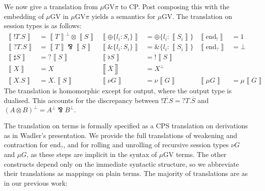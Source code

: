 \documentclass[orivec,envcountsame]{llncs}
\newcommand{\with}{\mathbin\binampersand}
\newcommand{\parr}{\mathbin\bindnasrepma}
\newcommand{\cpdual}[1]{#1^\perp}
\newcommand{\cpbang}[1]{{! #1}}
\newcommand{\cpquery}[1]{{? #1}}
\newcommand{\gvdual}[1]{\overline{#1}}
\newcommand{\gvout}[2]{{!#1.#2}}
\newcommand{\gvin}[2]{{?#1.#2}}
\newcommand{\outterm}{\mathrm{end}_!}
\newcommand{\interm}{\mathrm{end}_?}
\newcommand{\gvserver}[1]{\flat #1}
\newcommand{\gvservice}[1]{\sharp #1}
\newcommand{\tocp}[1]{\left\llbracket #1 \right\rrbracket}
\newcommand{\mugv}{$\mu\mathrm{GV}$\xspace}
\newcommand{\gvpi}{$\mu\mathrm{GV}\pi$\xspace}
\begin{document}
We now give a translation from \gvpi to CP. Post composing this with the embedding of \mugv in
\gvpi yields a semantics for \mugv. The translation on session types is as follows:
\begin{align*}
\tocp{\gvout{T}{S}}        &= \cpdual{\tocp{T}} \otimes \tocp{S} &
\tocp{\oplus \{l_i:S_i \}} &= \oplus \{l_i:\tocp{S_i}\} &
\tocp{\outterm}            &= 1 \\
\tocp{\gvin{T}{S}}         &= \tocp{T} \parr \tocp{S} &
\tocp{\with \{l_i:S_i \}}  &= \with \{l_i:\tocp{S_i}\} &
\tocp{\interm}             &= \bot \\
\tocp{\gvservice{S}}       &= \cpquery{\tocp{S}} &
\tocp{\gvserver{S}}        &= \cpbang{\tocp{S}} \\
\tocp{X}                   &= X &
\tocp{\gvdual{X}}          &= \cpdual{X} \\
\tocp{X.S}                 &= X. \tocp{S} &
\tocp{\nu G}               &= \nu \tocp{G} &
\tocp{\mu G}               &= \mu \tocp{G}
\end{align*}
The translation is homomorphic except for output, where the output type is dualised. This accounts
for the discrepancy between $\gvdual{\gvout{T}{S}} = \gvin{T}{\gvdual{S}}$ and
$\cpdual{(A \otimes B)} = \cpdual{A} \parr \cpdual{B}.$

The translation on terms is formally specified as a CPS translation on derivations as in Wadler's
presentation. We provide the full translations of weakening and contraction for $\interm$, and for
rolling and unrolling of recursive session types $\nu G$ and $\mu G$, as these steps are implicit in
the syntax of \mugv terms. The other constructs depend only on the immediate syntactic structure, so
we abbreviate their translations as mappings on plain terms.  The majority of translations are as in
our previous work:
\end{document}
